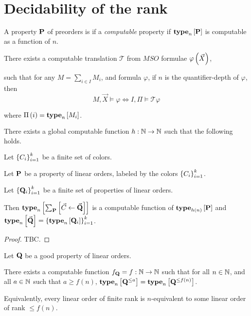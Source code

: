 \section{Decidability of the rank}
\begin{definition}
  A property $\mathbf{P}$ of preorders is if a
  \emph{computable} property if
  $\mathbf{type}_{n} \left[ {\mathbf{P}} \right]$ is computable as a function of $n$.
\end{definition}

\begin{theorem}
  There exists a computable translation $\mathcal{T}$
  from $MSO$ formulae $\varphi \left( {\vec{X}} \right)$,

  such that for any $M = \sum_{i \in I} M_i$, and formula $\varphi$,
  if $n$ is the quantifier-depth of $\varphi$,
  then
  \[
    M, \vec{X} \models \varphi \iff I, \Pi \models \mathcal{T} {\varphi}
  \]

  where $\Pi \left( {i} \right) = \mathbf{type}_{n} \left[ {M_i} \right]$.
\end{theorem}

\begin{lemma}
  There exists a global computable function
  $h : \mathbb{N} \to \mathbb{N}$ such that the following holds.

  Let $\left\{ {C_i} \right\}_{i=1}^k$ be a finite set of colors.

  Let $\mathbf{P}$ be a property of linear orders, labeled
  by the colors $\left\{ {C_i} \right\}_{i=1}^k$.

  Let $\left\{ {\mathbf{Q}_i} \right\}_{i=1}^k$ be a finite set of properties of linear orders.

  Then $\mathbf{type}_{n} \left[ {\sum_{\mathbf{P}} \left[ {{\vec{C}} \leftarrow {\vec{\mathbf{Q}}}} \right]} \right]$ is 
  a computable function of $\mathbf{type}_{h(n)} \left[ {\mathbf{P}} \right]$
  and $\mathbf{type}_{n} \left[ {\vec{\mathbf{Q}}} \right] = \left\{ {\mathbf{type}_{n} \left[ {\mathbf{Q}_i} \right]} \right\}_{i=1}^k$.
\end{lemma}

\begin{proof}
  TBC.
\end{proof}

\begin{lemma}\label{f-lemma}
  Let $\mathbf{Q}$ be a good property of linear orders.

  There exists a computable function $f_{\mathbf{Q}} = f: \mathbb{N} \to \mathbb{N}$ such that
  for all $n \in \mathbb{N}$, and all $a \in \mathbb{N}$ such that $a \ge f(n)$,
  $\mathbf{type}_{n} \left[ {\mathbf{Q}^{\le a}} \right] = \mathbf{type}_{n} \left[ {\mathbf{Q}^{\le f(n)}} \right]$.

  Equivalently, every linear order of finite rank is $n$-equivalent to some linear order of rank $\le f(n)$.
\end{lemma}

